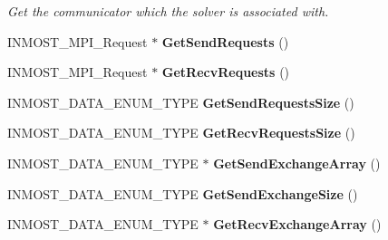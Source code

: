 \begin{DoxyCompactItemize}
\begin{DoxyCompactList}\small\item\em Get the communicator which the solver is associated with. \end{DoxyCompactList}\item 
\hypertarget{classINMOST_1_1Solver_1_1OrderInfo_a0e4e243c601d87a4be072c2fc8c1a3c9}{I\-N\-M\-O\-S\-T\-\_\-\-M\-P\-I\-\_\-\-Request $\ast$ {\bfseries Get\-Send\-Requests} ()}\label{classINMOST_1_1Solver_1_1OrderInfo_a0e4e243c601d87a4be072c2fc8c1a3c9}

\item 
\hypertarget{classINMOST_1_1Solver_1_1OrderInfo_a9fb17df8429be00a1a9489d44a04645e}{I\-N\-M\-O\-S\-T\-\_\-\-M\-P\-I\-\_\-\-Request $\ast$ {\bfseries Get\-Recv\-Requests} ()}\label{classINMOST_1_1Solver_1_1OrderInfo_a9fb17df8429be00a1a9489d44a04645e}

\item 
\hypertarget{classINMOST_1_1Solver_1_1OrderInfo_a3f0bac5fba6d238cb22a76c2094a5f48}{I\-N\-M\-O\-S\-T\-\_\-\-D\-A\-T\-A\-\_\-\-E\-N\-U\-M\-\_\-\-T\-Y\-P\-E {\bfseries Get\-Send\-Requests\-Size} ()}\label{classINMOST_1_1Solver_1_1OrderInfo_a3f0bac5fba6d238cb22a76c2094a5f48}

\item 
\hypertarget{classINMOST_1_1Solver_1_1OrderInfo_ae766d3d64dc46603feb600e1f19105c5}{I\-N\-M\-O\-S\-T\-\_\-\-D\-A\-T\-A\-\_\-\-E\-N\-U\-M\-\_\-\-T\-Y\-P\-E {\bfseries Get\-Recv\-Requests\-Size} ()}\label{classINMOST_1_1Solver_1_1OrderInfo_ae766d3d64dc46603feb600e1f19105c5}

\item 
\hypertarget{classINMOST_1_1Solver_1_1OrderInfo_ad3df60e1a4c9e016aef33a800e048dce}{I\-N\-M\-O\-S\-T\-\_\-\-D\-A\-T\-A\-\_\-\-E\-N\-U\-M\-\_\-\-T\-Y\-P\-E $\ast$ {\bfseries Get\-Send\-Exchange\-Array} ()}\label{classINMOST_1_1Solver_1_1OrderInfo_ad3df60e1a4c9e016aef33a800e048dce}

\item 
\hypertarget{classINMOST_1_1Solver_1_1OrderInfo_acb8c8c157fbdb8609047cad5a18407ea}{I\-N\-M\-O\-S\-T\-\_\-\-D\-A\-T\-A\-\_\-\-E\-N\-U\-M\-\_\-\-T\-Y\-P\-E {\bfseries Get\-Send\-Exchange\-Size} ()}\label{classINMOST_1_1Solver_1_1OrderInfo_acb8c8c157fbdb8609047cad5a18407ea}

\item 
\hypertarget{classINMOST_1_1Solver_1_1OrderInfo_a90ba99d91a554c149d20f1cbbcb9afee}{I\-N\-M\-O\-S\-T\-\_\-\-D\-A\-T\-A\-\_\-\-E\-N\-U\-M\-\_\-\-T\-Y\-P\-E $\ast$ {\bfseries Get\-Recv\-Exchange\-Array} ()}\label{classINMOST_1_1Solver_1_1OrderInfo_a90ba99d91a554c149d20f1cbbcb9afee}


\end{DoxyCompactItemize}
